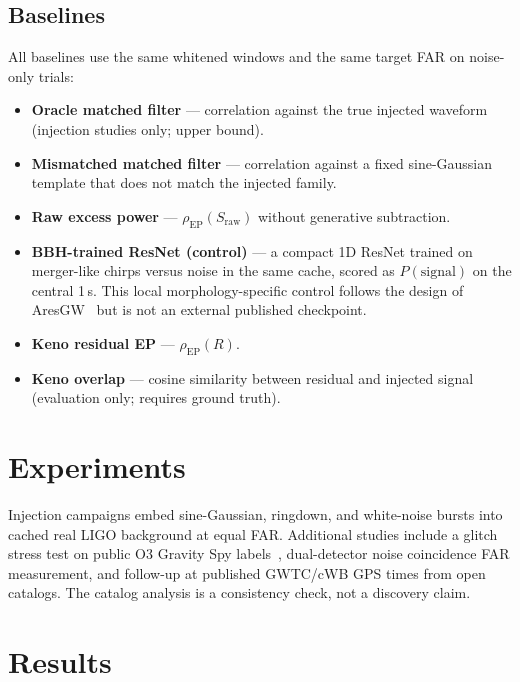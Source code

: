 \documentclass[11pt,a4paper]{article}
\begin{document}
\subsection{Baselines}
All baselines use the same whitened windows and the same target FAR on
noise-only trials:
\begin{itemize}
  \item \textbf{Oracle matched filter} --- correlation against the true
        injected waveform (injection studies only; upper bound).
  \item \textbf{Mismatched matched filter} --- correlation against a fixed
        sine-Gaussian template that does not match the injected family.
  \item \textbf{Raw excess power} --- $\rho_{\mathrm{EP}}(S_{\mathrm{raw}})$
        without generative subtraction.
  \item \textbf{BBH-trained ResNet (control)} --- a compact 1D ResNet trained
        on merger-like chirps versus noise in the same cache, scored as
        $P(\mathrm{signal})$ on the central 1\,s. This local
        morphology-specific control follows the design of AresGW~\citep{nousi2023}
        but is not an external published checkpoint.
  \item \textbf{Keno residual EP} --- $\rho_{\mathrm{EP}}(R)$.
  \item \textbf{Keno overlap} --- cosine similarity between residual and
        injected signal (evaluation only; requires ground truth).
\end{itemize}

\section{Experiments}

Injection campaigns embed sine-Gaussian, ringdown, and white-noise bursts into
cached real LIGO background at equal FAR. Additional studies include a glitch
stress test on public O3 Gravity Spy labels~\citep{glitchzoo2021},
dual-detector noise coincidence FAR measurement, and follow-up at published
GWTC/cWB GPS times from open catalogs. The catalog analysis is a consistency
check, not a discovery claim.

\section{Results}
\end{document}
